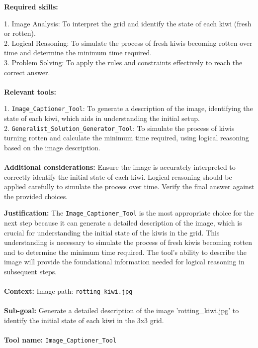 \begin{plannerbox}
\textbf{Required skills:}

1. Image Analysis: To interpret the grid and identify the state of each kiwi (fresh or rotten).\\
2. Logical Reasoning: To simulate the process of fresh kiwis becoming rotten over time and determine the minimum time required.\\
3. Problem Solving: To apply the rules and constraints effectively to reach the correct answer.
\\\\
\textbf{Relevant tools:}

1. \texttt{Image\_Captioner\_Tool}: To generate a description of the image, identifying the state of each kiwi, which aids in understanding the initial setup.\\
2. \texttt{Generalist\_Solution\_Generator\_Tool}: To simulate the process of kiwis turning rotten and calculate the minimum time required, using logical reasoning based on the image description.
\\\\
\textbf{Additional considerations:}
Ensure the image is accurately interpreted to correctly identify the initial state of each kiwi. Logical reasoning should be applied carefully to simulate the process over time. Verify the final answer against the provided choices.
\end{plannerbox}


\begin{plannerbox}

\textbf{Justification:}
The \texttt{Image\_Captioner\_Tool} is the most appropriate choice for the next step because it can generate a detailed description of the image, which is crucial for understanding the initial state of the kiwis in the grid. This understanding is necessary to simulate the process of fresh kiwis becoming rotten and to determine the minimum time required. The tool's ability to describe the image will provide the foundational information needed for logical reasoning in subsequent steps.
\\\\
\textbf{Context:}
Image path: \texttt{rotting\_kiwi.jpg}
\\\\
\textbf{Sub-goal:}
Generate a detailed description of the image 'rotting\_kiwi.jpg' to identify the initial state of each kiwi in the 3x3 grid.
\\\\
\textbf{Tool name:} \texttt{Image\_Captioner\_Tool}
\end{plannerbox}


